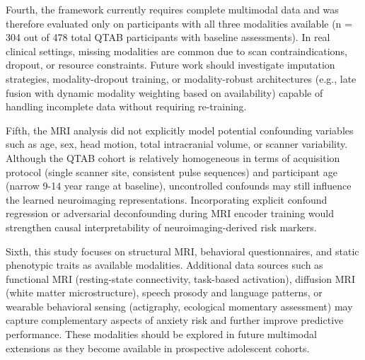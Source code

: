 \documentclass[10pt,letterpaper]{article}
\begin{document}
Fourth, the framework currently requires complete multimodal data and was therefore evaluated only on participants with all three modalities available (n = 304 out of 478 total QTAB participants with baseline assessments). In real clinical settings, missing modalities are common due to scan contraindications, dropout, or resource constraints. Future work should investigate imputation strategies, modality-dropout training, or modality-robust architectures (e.g., late fusion with dynamic modality weighting based on availability) capable of handling incomplete data without requiring re-training.

Fifth, the MRI analysis did not explicitly model potential confounding variables such as age, sex, head motion, total intracranial volume, or scanner variability. Although the QTAB cohort is relatively homogeneous in terms of acquisition protocol (single scanner site, consistent pulse sequences) and participant age (narrow 9-14 year range at baseline), uncontrolled confounds may still influence the learned neuroimaging representations. Incorporating explicit confound regression or adversarial deconfounding during MRI encoder training would strengthen causal interpretability of neuroimaging-derived risk markers.

Sixth, this study focuses on structural MRI, behavioral questionnaires, and static phenotypic traits as available modalities. Additional data sources such as functional MRI (resting-state connectivity, task-based activation), diffusion MRI (white matter microstructure), speech prosody and language patterns, or wearable behavioral sensing (actigraphy, ecological momentary assessment) may capture complementary aspects of anxiety risk and further improve predictive performance. These modalities should be explored in future multimodal extensions as they become available in prospective adolescent cohorts.
\end{document}
